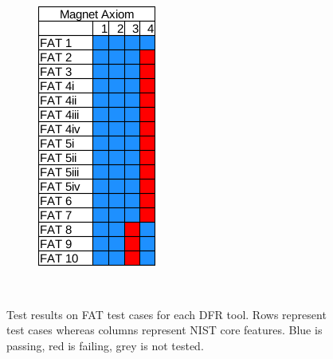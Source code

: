 \begin{figure}[h!]
\begin{subfigure}{0.17\linewidth}
    \end{subfigure}~~
    \begin{subfigure}{0.17\linewidth}
        \includegraphics[width=\linewidth]{fig/axiom_results_fat.png}
    \end{subfigure}~~
        
    \caption{Test results on FAT test cases for each DFR tool. Rows represent test cases whereas columns represent NIST core features. Blue is passing, red is failing, grey is not tested.}
    \label{fig:results_fat}
\end{figure}

